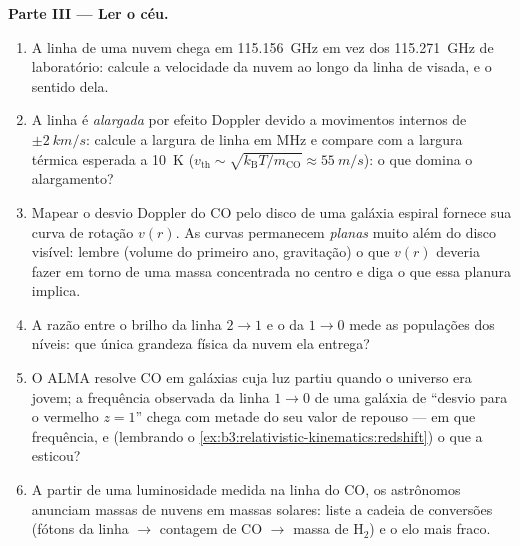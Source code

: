 \begin{problem}
\medskip\noindent\textbf{Parte III --- Ler o céu.}
\begin{enumerate}[resume]
  \item A linha de uma nuvem chega em \qty{115.156}{GHz} em vez dos
        \qty{115.271}{GHz} de laboratório: calcule a velocidade da
        nuvem ao longo da linha de visada, e o sentido dela.
  \item A linha é \emph{alargada} por efeito Doppler devido a
        movimentos internos de $\pm\qty{2}{km/s}$: calcule a largura de
        linha em MHz e compare com a largura térmica esperada a
        \qty{10}{K} ($v_{\text{th}} \sim \sqrt{k_{\text{B}}T/m_{\text{CO}}}
        \approx \qty{55}{m/s}$): o que domina o alargamento?
  \item Mapear o desvio Doppler do CO pelo disco de uma galáxia
        espiral fornece sua curva de rotação $v(r)$. As curvas
        permanecem \emph{planas} muito além do disco visível: lembre
        (volume do primeiro ano, gravitação) o que $v(r)$ deveria fazer
        em torno de uma massa concentrada no centro e diga o que essa
        planura implica.
  \item A razão entre o brilho da linha $2\to1$ e o da $1\to0$ mede as
        populações dos níveis: que única grandeza física da nuvem ela
        entrega?
  \item O ALMA resolve CO em galáxias cuja luz partiu quando o
        universo era jovem; a frequência observada da linha
        $1 \to 0$ de uma galáxia de ``desvio para o vermelho $z = 1$''
        chega com metade do seu valor de repouso --- em que
        frequência, e (lembrando o
        \cref{ex:b3:relativistic-kinematics:redshift}) o que a
        esticou?
  \item A partir de uma luminosidade medida na linha do CO, os
        astrônomos anunciam massas de nuvens em massas solares: liste a
        cadeia de conversões (fótons da linha $\to$ contagem de CO
        $\to$ massa de H$_2$) e o elo mais fraco.
\end{enumerate}


\end{problem}
